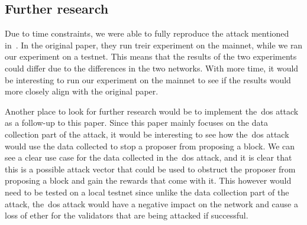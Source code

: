\subsection{Further research}\label{subsec:further-research}
Due to time constraints, we were able to fully reproduce the attack mentioned in~\cite{heimbach2024deanonymizingethereumvalidatorsp2p}.
In the original paper, they run treir experiment on the mainnet, while we ran our experiment on a testnet.
This means that the results of the two experiments could differ due to the differences in the two networks.
With more time, it would be interesting to run our experiment on the mainnet to see if the results would more closely align with the original paper.


Another place to look for further research would be to implement the~\gls{dos} attack as a follow-up to this paper.
Since this paper mainly focuses on the data collection part of the attack, it would be interesting to see how the~\gls{dos} attack would use the data collected to stop a proposer from proposing a block.
We can see a clear use case for the data collected in the~\gls{dos} attack, and it is clear that this is a possible attack vector that could be used to obstruct the proposer from proposing a block and gain the rewards that come with it.
This however would need to be tested on a local testnet since unlike the data collection part of the attack, the~\gls{dos} attack would have a negative impact on the network and cause a loss of ether for the validators that are being attacked if successful.